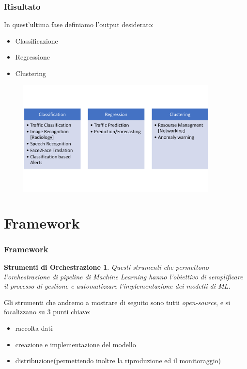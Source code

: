 \documentclass[xcolor=dvipsnames]{beamer}
\begin{document}
\begin{frame}
    \frametitle{Risultato}
    In quest'ultima fase definiamo l'output desiderato:
    \begin{itemize}
        \item Classificazione
        \item Regressione 
        \item Clustering
    \end{itemize}
    \begin{figure}
        \includegraphics[width=0.9\textwidth , height=0.7\textheight]{categoryML.png}
    \end{figure}
\end{frame}
\section{Framework}

\begin{frame}    
        \frametitle{Framework}
        \newtheorem{fw}{Strumenti di Orchestrazione}

        \begin{fw}
            Questi strumenti che permettono l'orchestrazione di pipeline di Machine Learning  hanno l'obiettivo di semplificare il processo di gestione e automatizzare l'implementazione dei modelli di ML.
        \end{fw}
        Gli strumenti che andremo a mostrare di seguito sono tutti \textit{open-source}, e si focalizzano su 3 punti chiave:
        \begin{itemize}
            \item raccolta dati
            \item creazione e implementazione del modello
            \item distribuzione(permettendo inoltre la riproduzione ed il monitoraggio)
        \end{itemize}
\end{frame}
\end{document}
